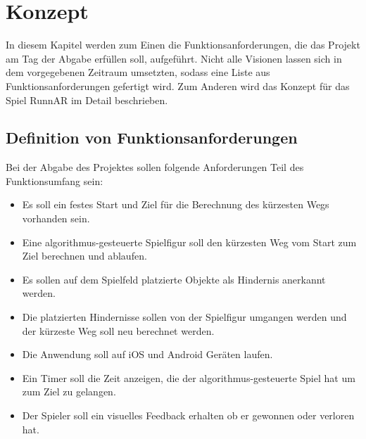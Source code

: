 \chapter{Konzept}
\label{sec:conzept}
In diesem Kapitel werden zum Einen die Funktionsanforderungen, die das Projekt am Tag der Abgabe erfüllen soll, aufgeführt. Nicht alle Visionen lassen sich in dem vorgegebenen Zeitraum umsetzten, sodass eine Liste aus Funktionsanforderungen gefertigt wird. Zum Anderen wird das Konzept für das Spiel RunnAR im Detail beschrieben.

\section{Definition von Funktionsanforderungen}
Bei der Abgabe des Projektes sollen folgende Anforderungen Teil des Funktionsumfang sein:
\begin{itemize}
\item Es soll ein festes Start und Ziel für die Berechnung des kürzesten Wegs vorhanden sein.
\item Eine algorithmus-gesteuerte Spielfigur soll den kürzesten Weg vom Start zum Ziel berechnen und ablaufen.
\item Es sollen auf dem Spielfeld platzierte Objekte als Hindernis anerkannt werden.
\item Die platzierten Hindernisse sollen von der Spielfigur umgangen werden und der kürzeste Weg soll neu berechnet werden.
\item Die Anwendung soll auf iOS und Android Geräten laufen.
\item Ein Timer soll die Zeit anzeigen, die der algorithmus-gesteuerte Spiel hat um zum Ziel  zu gelangen.
\item Der Spieler soll ein visuelles Feedback erhalten ob er gewonnen oder verloren hat.
\end{itemize}

